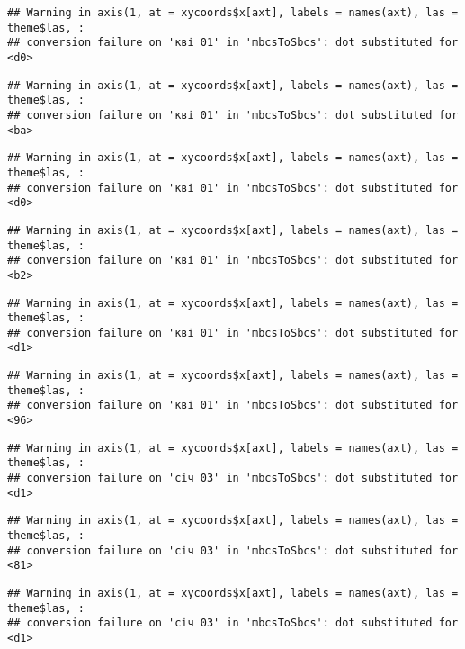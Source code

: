 \documentclass[]{article}
\begin{document}
\begin{verbatim}
## Warning in axis(1, at = xycoords$x[axt], labels = names(axt), las = theme$las, :
## conversion failure on 'кві 01' in 'mbcsToSbcs': dot substituted for <d0>
\end{verbatim}

\begin{verbatim}
## Warning in axis(1, at = xycoords$x[axt], labels = names(axt), las = theme$las, :
## conversion failure on 'кві 01' in 'mbcsToSbcs': dot substituted for <ba>
\end{verbatim}

\begin{verbatim}
## Warning in axis(1, at = xycoords$x[axt], labels = names(axt), las = theme$las, :
## conversion failure on 'кві 01' in 'mbcsToSbcs': dot substituted for <d0>
\end{verbatim}

\begin{verbatim}
## Warning in axis(1, at = xycoords$x[axt], labels = names(axt), las = theme$las, :
## conversion failure on 'кві 01' in 'mbcsToSbcs': dot substituted for <b2>
\end{verbatim}

\begin{verbatim}
## Warning in axis(1, at = xycoords$x[axt], labels = names(axt), las = theme$las, :
## conversion failure on 'кві 01' in 'mbcsToSbcs': dot substituted for <d1>
\end{verbatim}

\begin{verbatim}
## Warning in axis(1, at = xycoords$x[axt], labels = names(axt), las = theme$las, :
## conversion failure on 'кві 01' in 'mbcsToSbcs': dot substituted for <96>
\end{verbatim}

\begin{verbatim}
## Warning in axis(1, at = xycoords$x[axt], labels = names(axt), las = theme$las, :
## conversion failure on 'січ 03' in 'mbcsToSbcs': dot substituted for <d1>
\end{verbatim}

\begin{verbatim}
## Warning in axis(1, at = xycoords$x[axt], labels = names(axt), las = theme$las, :
## conversion failure on 'січ 03' in 'mbcsToSbcs': dot substituted for <81>
\end{verbatim}

\begin{verbatim}
## Warning in axis(1, at = xycoords$x[axt], labels = names(axt), las = theme$las, :
## conversion failure on 'січ 03' in 'mbcsToSbcs': dot substituted for <d1>
\end{verbatim}
\end{document}
